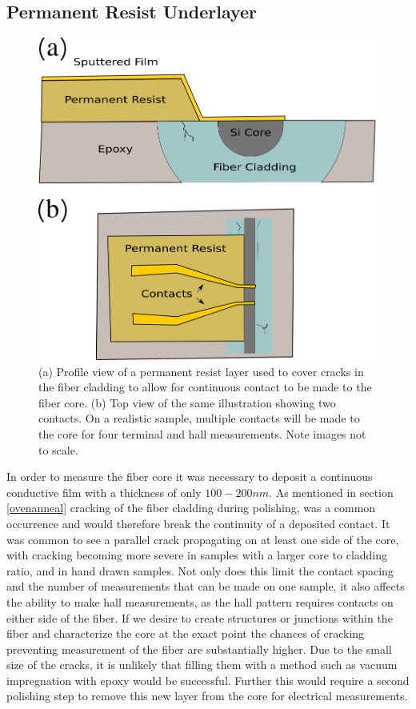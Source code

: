  
 

\subsection{Permanent Resist Underlayer}  \label{permanentunderlayer} %
\begin{figure}[!htb]
    \centering
    \includegraphics[width=.7\textwidth]{fig/Methods/permanentresist_test.png}
    \caption{(a) Profile view of a permanent resist layer used to cover cracks in the fiber cladding to allow for continuous contact to be made to the fiber core. (b) Top view of the same illustration showing two contacts. On a realistic sample, multiple contacts will be made to the core for four terminal and hall measurements. Note images not to scale. }
    \label{fig:permanentresist}
\end{figure}
In order to measure the fiber core it was necessary to deposit a continuous conductive film with a thickness of only $100-200 \si{nm}$. As mentioned in section \ref{ovenanneal} cracking of the fiber cladding during polishing, was a common occurrence and would therefore break the continuity of a deposited contact. It was common to see a parallel crack propagating on at least one side of the core, with cracking becoming more severe in samples with a larger core to cladding ratio, and in hand drawn samples. Not only does this limit the contact spacing and the number of measurements that can be made on one sample, it also affects the ability to make hall measurements, as the hall pattern requires contacts on either side of the fiber. If we desire to create structures or junctions within the fiber and characterize the core at the exact point the chances of cracking preventing measurement of the fiber are substantially higher. Due to the small size of the cracks, it is unlikely that filling them with a method such as vacuum impregnation with epoxy would be successful. Further this would require a second polishing step to remove this new layer from the core for electrical measurements.

